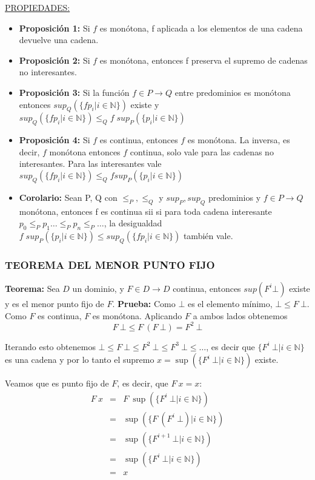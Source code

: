   \PN \underline{PROPIEDADES:}
    \begin{itemize}
      \item \textbf{Proposición 1:} Si $f$ es monótona, f aplicada a los elementos de una cadena devuelve una cadena.
      \item \textbf{Proposición 2:} Si $f$ es monótona, entonces f preserva el supremo de cadenas no interesantes.
      \item \textbf{Proposición 3:} Si la función $f \in P \rightarrow Q$ entre predominios es monótona entonces $sup_Q(\{f p_i | i \in \mathbb{N}\})$ existe y $sup_Q(\{f p_i | i \in \mathbb{N}\}) \leq_Q f \; sup_P(\{p_i | i \in \mathbb{N}\})$
      \item \textbf{Proposición 4:} Si $f$ es continua, entonces $f$ es monótona.
        \PN La inversa, es decir, $f$ monótona entonces $f$ continua, solo vale para las cadenas no interesantes. Para las interesantes vale $sup_Q(\{f p_i | i \in \mathbb{N}\}) \leq_Q f sup_P(\{p_i | i \in \mathbb{N}\})$
      \item \textbf{Corolario:} Sean P, Q con $\leq_P, \leq_Q$ y $sup_P, sup_Q$ predominios y $f \in P \rightarrow Q$ monótona, entonces f es continua sii si para toda cadena interesante $p_0 \leq_P p_1 \dotsc \leq_P p_n \leq_P \dotsc$, la desigualdad $f \; sup_P(\{p_i | i \in \mathbb{N}\}) \leq sup_Q(\{f p_i | i \in \mathbb{N}\})$ también vale.
    \end{itemize}

  \subsubsection*{TEOREMA DEL MENOR PUNTO FIJO}
    \PN \textbf{Teorema:} Sea $D$ un dominio, y $F \in D \rightarrow D$ continua, entonces $sup(F^i \bot)$ existe y es el menor punto fijo de $F$.
    \PN \textbf{Prueba:} Como $\bot$ es el elemento mínimo, $\bot \leq F\ \bot$. Como $F$ es continua, $F$ es monótona. Aplicando $F$ a ambos lados obtenemos
    \[ F\ \bot \leq F\ (F\ \bot) = F^2\ \bot\]
    
    \PN Iterando esto obtenemos $\bot \leq F\ \bot \leq F^2\ \bot \leq F^3\ \bot \leq \ldots$, es decir que $\{F^i\ \bot|i \in \mathbb N\}$ es una cadena y por lo tanto el supremo $x = \sup(\{F^i\ \bot|i \in \mathbb N\})$ existe.
    
    \PN Veamos que es punto fijo de $F$, es decir, que $F\ x = x$:
    \[
      \begin{array}{rcl}
        F\ x &=& F\ \sup(\{F^i\ \bot|i \in \mathbb N\}) \\
               &=& \sup(\{F\ (F^i\ \bot)|i \in \mathbb N\}) \\
               &=& \sup(\{F^{i+1}\ \bot|i \in \mathbb N\}) \\
               &=& \sup(\{F^i\ \bot|i \in \mathbb N\}) \\
               &=& x
      \end{array}
    \]
    
